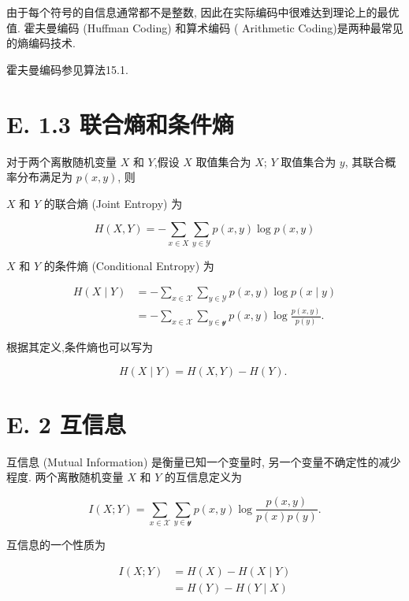 \documentclass[10pt]{article}
\begin{document}
由于每个符号的自信息通常都不是整数, 因此在实际编码中很难达到理论上的最优值. 霍夫曼编码 (Huffman Coding) 和算术编码 ( Arithmetic Coding)是两种最常见的熵编码技术.

霍夫曼编码参见算法15.1.

\section*{E. 1.3 联合熵和条件熵}
对于两个离散随机变量 $X$ 和 $Y$,假设 $X$ 取值集合为 $X$; $Y$ 取值集合为 $y$, 其联合概率分布满足为 $p(x, y)$, 则

$X$ 和 $Y$ 的联合熵 (Joint Entropy) 为


\begin{equation*}
H(X, Y)=-\sum_{x \in X} \sum_{y \in \mathcal{Y}} p(x, y) \log p(x, y) \tag{E.5}
\end{equation*}


$X$ 和 $Y$ 的条件熵 (Conditional Entropy) 为


\begin{align*}
H(X \mid Y) & =-\sum_{x \in \mathcal{X}} \sum_{y \in \mathcal{Y}} p(x, y) \log p(x \mid y)  \tag{E.6}\\
& =-\sum_{x \in \mathcal{X}} \sum_{y \in \mathcal{y}} p(x, y) \log \frac{p(x, y)}{p(y)} . \tag{E.7}
\end{align*}


根据其定义,条件熵也可以写为


\begin{equation*}
H(X \mid Y)=H(X, Y)-H(Y) \text {. } \tag{E.8}
\end{equation*}


\section*{E. 2 互信息}
互信息 (Mutual Information) 是衡量已知一个变量时, 另一个变量不确定性的减少程度. 两个离散随机变量 $X$ 和 $Y$ 的互信息定义为


\begin{equation*}
I(X ; Y)=\sum_{x \in \mathcal{X}} \sum_{y \in \mathcal{y}} p(x, y) \log \frac{p(x, y)}{p(x) p(y)} . \tag{E.9}
\end{equation*}


互信息的一个性质为


\begin{align*}
I(X ; Y) & =H(X)-H(X \mid Y)  \tag{E.10}\\
& =H(Y)-H(Y \mid X) \tag{E.11}
\end{align*}
\end{document}
